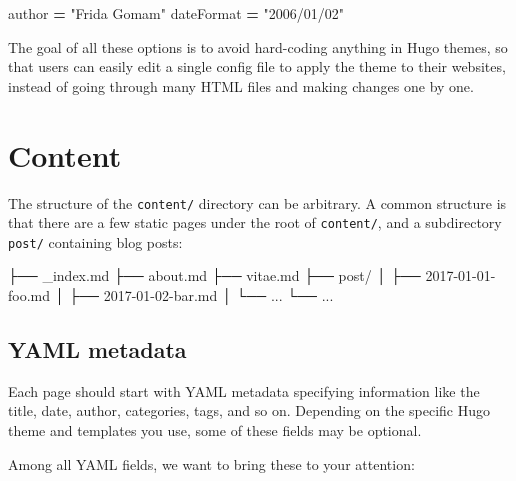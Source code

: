 \documentclass[12pt,]{krantz}
\makeatletter
\newenvironment{Shaded}{\begin{snugshade}}{\end{snugshade}}
\newcommand{\ExtensionTok}[1]{#1}
\newcommand{\NormalTok}[1]{#1}
\newcommand{\OperatorTok}[1]{\textcolor[rgb]{0.81,0.36,0.00}{\textbf{#1}}}
\newcommand{\StringTok}[1]{\textcolor[rgb]{0.31,0.60,0.02}{#1}}
\newenvironment{kframe}{%
\medskip{}
\setlength{\fboxsep}{.8em}
 \def\at@end@of@kframe{}%
 \ifinner\ifhmode%
  \def\at@end@of@kframe{\end{minipage}}%
  \begin{minipage}{\columnwidth}%
 \fi\fi%
 \def\FrameCommand##1{\hskip\@totalleftmargin \hskip-\fboxsep
 \colorbox{shadecolor}{##1}\hskip-\fboxsep
     \hskip-\linewidth \hskip-\@totalleftmargin \hskip\columnwidth}%
 \MakeFramed {\advance\hsize-\width
   \@totalleftmargin\z@ \linewidth\hsize
   \@setminipage}}%
 {\par\unskip\endMakeFramed%
 \at@end@of@kframe}
\renewenvironment{Shaded}{\begin{kframe}}{\end{kframe}}
\theoremstyle{definition}
\theoremstyle{definition}
\theoremstyle{definition}
\theoremstyle{remark}
\makeatother
\begin{document}
\begin{Shaded}
\begin{Highlighting}[]
\NormalTok{[params]}
\NormalTok{    author }\OperatorTok{=} \StringTok{"Frida Gomam"}
\NormalTok{    dateFormat }\OperatorTok{=} \StringTok{"2006/01/02"}
\end{Highlighting}
\end{Shaded}

The goal of all these options is to avoid hard-coding anything in Hugo
themes, so that users can easily edit a single config file to apply the
theme to their websites, instead of going through many HTML files and
making changes one by one.

\hypertarget{content}{%
\section{Content}\label{content}}

The structure of the \texttt{content/} directory can be arbitrary. A
common structure is that there are a few static pages under the root of
\texttt{content/}, and a subdirectory \texttt{post/} containing blog
posts:

\begin{Shaded}
\begin{Highlighting}[]
\NormalTok{├── }\ExtensionTok{_index.md}
\NormalTok{├── }\ExtensionTok{about.md}
\NormalTok{├── }\ExtensionTok{vitae.md}
\NormalTok{├── }\ExtensionTok{post/}
\NormalTok{│   ├── }\ExtensionTok{2017-01-01-foo.md}
\NormalTok{│   ├── }\ExtensionTok{2017-01-02-bar.md}
\NormalTok{│   └── }\ExtensionTok{...}
\NormalTok{└── }\ExtensionTok{...}
\end{Highlighting}
\end{Shaded}

\hypertarget{yaml-metadata}{%
\subsection{YAML metadata}\label{yaml-metadata}}

Each page should start with YAML metadata specifying
information like the title, date, author, categories, tags, and so on.
Depending on the specific Hugo theme and templates you use, some of
these fields may be optional.

Among all YAML fields, we want to bring these to your attention:
\end{document}
